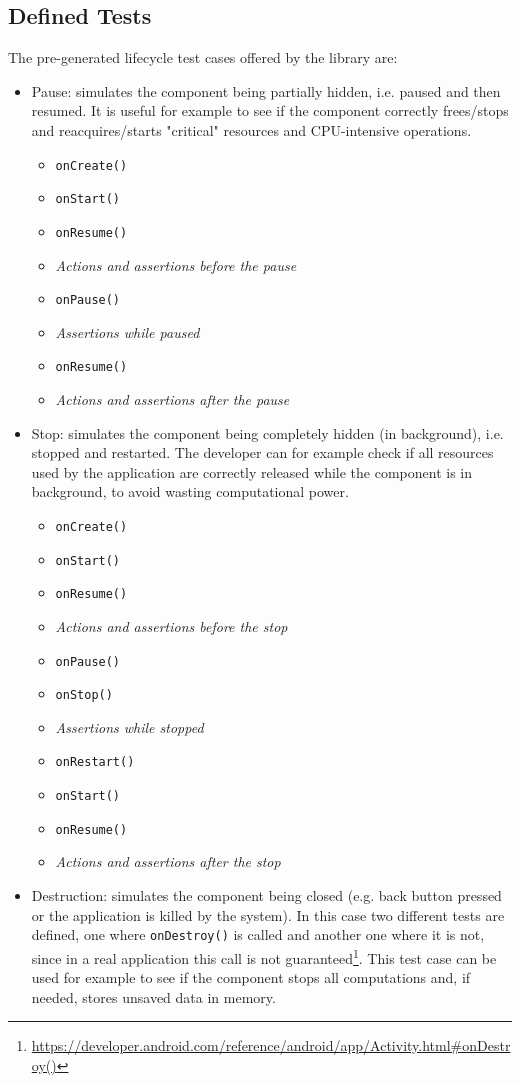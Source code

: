 \documentclass[11pt,a4paper,notitlepage]{article}
\begin{document}
\subsection{Defined Tests}
The pre-generated lifecycle test cases offered by the library are:
\begin{itemize}
	\item Pause: simulates the component being partially hidden, i.e. paused and then resumed. It is useful for example to see if the component correctly frees/stops and reacquires/starts "critical" resources and CPU-intensive operations.
	\begin{itemize}
		\item \texttt{onCreate()}
		\item \texttt{onStart()}
		\item \texttt{onResume()}
		\item \textit{Actions and assertions before the pause}
		\item \texttt{onPause()}
		\item \textit{Assertions while paused}
		\item \texttt{onResume()}
		\item \textit{Actions and assertions after the pause}
	\end{itemize}
	\item Stop: simulates the component being completely hidden (in background), i.e. stopped and restarted. The developer can for example check if all resources used by the application are correctly released while the component is in background, to avoid wasting computational power.
	\begin{itemize}
		\item \texttt{onCreate()}
		\item \texttt{onStart()}
		\item \texttt{onResume()}
		\item \textit{Actions and assertions before the stop}
		\item \texttt{onPause()}
		\item \texttt{onStop()}
		\item \textit{Assertions while stopped}
		\item \texttt{onRestart()}
		\item \texttt{onStart()}
		\item \texttt{onResume()}
		\item \textit{Actions and assertions after the stop}
	\end{itemize}
	\item Destruction: simulates the component being closed (e.g. back button pressed or the application is killed by the system). In this case two different tests are defined, one where \texttt{onDestroy()} is called and another one where it is not, since in a real application this call is not guaranteed\footnote{\url{https://developer.android.com/reference/android/app/Activity.html\#onDestroy()}}. This test case can be used for example to see if the component stops all computations and, if needed, stores unsaved data in memory.

\end{itemize}
\end{document}
